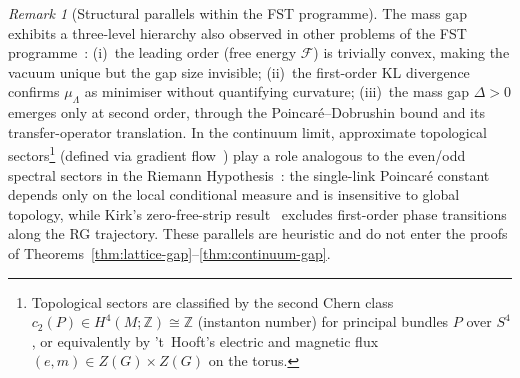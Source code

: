 \documentclass[12pt,a4paper]{article}
\theoremstyle{definition}
\theoremstyle{plain}
\theoremstyle{remark}
\newtheorem{remark}[definition]{Remark}
\begin{document}
\begin{remark}[Structural parallels within the FST programme]\label{rem:fst-parallels}
The mass gap exhibits a three-level hierarchy also observed in
other problems of the FST programme~\cite{FST-Unified2026}: (i)~the
leading order (free energy $\mathcal{F}$) is trivially convex, making
the vacuum unique but the gap size invisible; (ii)~the
first-order KL divergence confirms $\mu_\Lambda$ as minimiser without
quantifying curvature; (iii)~the mass gap $\Delta > 0$ emerges only
at second order, through the Poincar\'e--Dobrushin bound and its
transfer-operator translation. In the continuum limit, approximate
topological sectors\footnote{Topological sectors are classified by the second Chern class $c_2(P) \in H^4(M;\mathbb{Z}) \cong \mathbb{Z}$ (instanton number) for principal bundles $P$ over $S^4$, or equivalently by 't~Hooft's electric and magnetic flux $(e, m) \in Z(G) \times Z(G)$ on the torus.} (defined via gradient flow~\cite{Luscher2010}) play a
role analogous to the even/odd spectral sectors in the
Riemann Hypothesis~\cite{GeigerRH2026c}: the single-link Poincar\'e constant
depends only on the local conditional measure and is insensitive to
global topology, while Kirk's zero-free-strip result~\cite{Kirk2026b}
excludes first-order phase transitions along the RG trajectory.
These parallels are heuristic and do not enter the proofs of
Theorems~\ref{thm:lattice-gap}--\ref{thm:continuum-gap}.
\end{remark}
\end{document}
